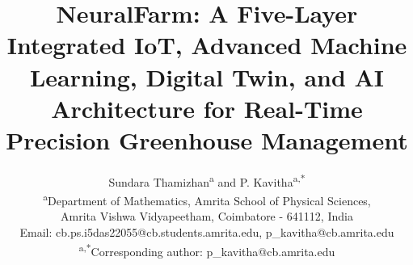 \documentclass[journal,10pt,twocolumn]{IEEEtran}
\begin{document}
\title{NeuralFarm: A Five-Layer Integrated IoT, Advanced Machine
  Learning, Digital Twin, and AI Architecture for Real-Time
  Precision Greenhouse Management}

\author{
    Sundara Thamizhan\textsuperscript{a} and P. Kavitha\textsuperscript{a,*}\\[1.5ex]
    \normalsize \textsuperscript{a}Department of Mathematics, Amrita School of Physical Sciences,\\
    \normalsize Amrita Vishwa Vidyapeetham, Coimbatore - 641112, India\\
    \normalsize Email: cb.ps.i5das22055@cb.students.amrita.edu, p\_kavitha@cb.amrita.edu\\[1ex]
    \normalsize \textsuperscript{a,*}Corresponding author: p\_kavitha@cb.amrita.edu
}

  
\maketitle
\end{document}
